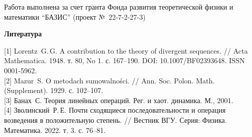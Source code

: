 \documentclass[14pt, a4paper]{extbook}
\begin{document}
{\small
	Работа выполнена за счет гранта Фонда развития теоретической
	физики и математики ``БАЗИС'' (проект №~22-7-2-27-3)
} %


\begin{center}
{\small \bf Литература}
\end{center}
\small
	{[1]}
	{Lorentz~G.\,G.} A contribution to the theory of divergent sequences.
	// Acta Mathematica. 1948. т. 80, No 1. с. 167--190.
	DOI: 10.1007/BF02393648. ISSN 0001-5962.
	\\
	{[2]}
	{Mazur~S.} O metodach sumowalności. // Ann. Soc. Polon. Math.
	(Supple\-ment). 1929. с. 102--107.
	\\
	{[3]}
	{Банах~С.} Теория линейных операций. Рег. и хаот.
	динамика. М., 2001.
	\\
	{[4]}
	Зволинский~Р.\,Е. Почти сходящиеся последовательности и операция
	возведения в положительную степень. // Вестник ВГУ. Серия: Физика.
	Математика. 2022. т. 3. с. 76--81.
\end{document}
